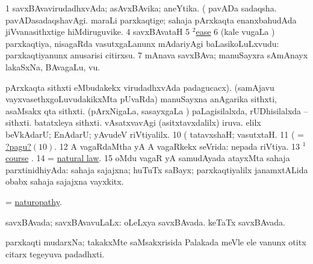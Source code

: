 \noindent
\gl{\pagu}
\bmng
\bnum
\num{1}  savxBAvavirudadhxvAda; asAvxBAvika; aneYtika. 
  (  
\banum
{} pavADa sadaqsha. 
 pavADasadaqshavAgi. 
  maraLi parxkaqtige; sahaja pArxkaqta enanxbahudAda jiVvanasithxtige hiMdiruguvike. 
\eanum
\numie
\num{4}  savxBAvataH 
\num{5} \hyperref{kandict_e.pdf}{E}{ease(2) nuga(1)}{$^2$ease}  
\num{6}  (kale \mo vugaLa \vi) parxkaqtiya, nisagaRda vasutxgaLanunx mAdariyAgi baLasikoLuLxvudu:  parxkaqtiyanunx anusarisi citirxsu. 
\num{7}  mAnava savxBAva; manuSayxra sAmAnayx lakaSxNa, BAvagaLu, \mo vu. 
  
\banum
{} pArxkaqta sithxti  eMbudakekx virudadhxvAda padagucacx). 
 (samAjavu vayxvasethxgoLuvudakikxMta pUvaRda) manuSayxna anAgarika sithxti, asaMsakx qta sithxti. 
 (pArxNigaLa, sasayxgaLa \vi) paLagisilalxda, rUDhisilalxda -- sithxti. 
 batatxleya sithxti. 
\eanum
\numie
{}  
\banum
{} vAsatxvavAgi (asitxtavxdalilx) iruva. 
 elilx beVkAdarU; EnAdarU; yAvudeV riVtiyalilx. 
\hypertarget{naturepagu10}{} 
\eanum
\numie
\num{10}  (    tatavxshaH; vasutxtaH. 
\num{11}  (    = \hyperlink{naturepagu10}{?pagu?\((10)\)}. 
\num{12}    A vagaRdaMtha yA A vagaRkekx seVrida:  nepada riVtiya. 
\num{13}  \hyperref{kandict_c.pdf}{C}{course(1) pagu(5)}{$^1$course} . 
\num{14}  = \hyperlink{natural law}{natural law}.
\num{15}  oMdu vagaR yA samudAyada atayxMta sahaja parxtinidhiyAda:  sahaja sajajxna; huTuTx saBayx; parxkaqtiyalilx janamxtALida obabx sahaja sajajxna vayxkitx. 
\enum
\emng
\eentry

\bentry
{}
\gl{\nA}
\bmng
= \hyperlink{naturopathy}{naturopathy}.
\emng
\eentry

\bentry
{}
\gl{\gu}
\bmng
savxBAvada; savxBAvavuLaLx:  oLeLxya savxBAvada.  keTaTx savxBAvada. 
\emng
\eentry

\bentry
{}
\gl{\nA}
\bmng
parxkaqti mudarxNa; takakxMte saMsakxrisida Palakada meVle ele \mo vanunx otitx citarx tegeyuva padadhxti. 
\emng
\eentry

